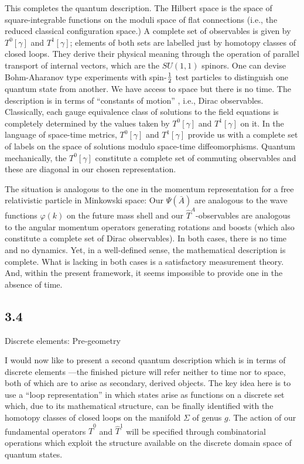 This completes the quantum description. The Hilbert space is the space
of square-integrable functions on the moduli space of flat connections
(i.e., the reduced classical configuration space.) A complete set of
observables is given by $T^0[\gamma ]$ and $T^1[\gamma ]$; elements of
both sets are labelled just by homotopy classes of closed loops. They
derive their physical meaning through the operation of parallel transport
of internal vectors, which are the $SU(1,1)$ spinors. One can devise
Bohm-Aharanov type experiments with spin-${1\over 2}$ test particles to
distinguish one quantum state from another. We have access to space but
there is no time. The description is in terms of ``constants of motion'' ,
i.e., Dirac observables. Classically, each gauge equivalence class of
solutions to the field equations is completely determined by the values taken
by $T^0[\gamma ]$ and $T^1[\gamma ]$ on it. In the language of space-time
metrics, $T^0[\gamma ]$ and $T^1[\gamma]$ provide us with a complete
set of labels on the space of solutions modulo space-time diffeomorphisms.
Quantum mechanically, the $T^0[\gamma]$ constitute a complete set of commuting
observables and these are diagonal in our chosen representation.

The situation is analogous to the one in the momentum representation for
a free relativistic particle in Minkowski space: Our $\Psi (\bar{A})$ are
analogous to the wave functions $\varphi (k)$ on the future mass shell and
our $\hat{T}^A$-observables are analogous to the angular momentum operators
generating rotations and boosts (which also constitute a complete set of
Dirac observables). In both cases, there is no time and no dynamics. Yet, in
a well-defined sense, the mathematical description is complete. What is
lacking in both cases is a satisfactory measurement theory. And, within
the present framework, it seems impossible to provide one
in the absence of time.

\goodbreak
\subsection{3.4}{Discrete elements: Pre-geometry}%

I would now like to present a second quantum description which is in terms of
discrete elements ---the finished picture will refer neither to time nor to
space, both of which are to arise as secondary, derived objects. The key idea
here is to use a ``loop representation'' in which states arise as functions
on a discrete set which, due to its mathematical structure, can be finally
identified with the homotopy classes of closed loops on the manifold $\Sigma$
of genus $g$. The action of our fundamental operators $\hat{T}^0$ and
$\hat{T}^1$ will be specified through combinatorial operations which exploit
the structure available on the discrete domain space of quantum states.

